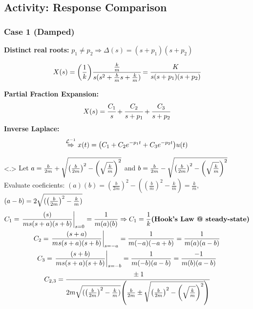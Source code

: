 \documentclass[aspectratio=169]{beamer}
\begin{document}
\subsection{Activity: Response Comparison}
\begin{frame}
	\frametitle{Case 1 (Damped)}

	\textbf{Distinct real roots:}
	$p_1 \neq p_2 \Rightarrow \Delta(s) = (s+p_1) (s+p_2)$

	\pause{}
	\[
		X(s) = \qty(\frac{1}{k}) \cfrac{\frac{k}{m}}{s(s^2 + \frac{b}{m} s + \frac{k}{m})}
		= \cfrac{K}{s(s+p_1)(s+p_2)}
	\]
	\pause{}

	\textbf{Partial Fraction Expansion:} %
	\[
		X(s) = \cfrac{C_1}{s} + \cfrac{C_2}{s+p_1} + \cfrac{C_3}{s+p_2}
	\]
	\pause{}
	\textbf{Inverse Laplace:}
	\[
		\overset{\mathcal{L}^{-1}}{\Rightarrow}
		x(t) = \qty(C_1 + C_2 e^{-p_1t} + C_3 e^{-p_2t}) u(t)	
	\]

	{
		Let $a = \frac{b}{2m} + \sqrt{\qty(\frac{b}{2m})^2 - \qty(\sqrt{\frac{k}{m}})^2}$ and $b = \frac{b}{2m} - \sqrt{\qty(\frac{b}{2m})^2 - \qty(\sqrt{\frac{k}{m}})^2}$
		Evaluate coeficients:
		$(a)(b) = (\frac{b}{2m})^2 - ((\frac{b}{m})^2-\frac{k}{m}) = \frac{k}{m}$, \quad $(a-b) = 2\sqrt{(\qty(\frac{b}{2m})^2 - \frac{k}{m})}$
		\begin{gather*}
			C_1 = \eval{\frac{(s)}{m s(s+a)(s+b)}}_{s=0}
			= \frac{1}{m (a)(b)}
			\Rightarrow
			C_1 = \frac{1}{k} \textbf{(Hook's Law @ steady-state)}
			\\
			C_2 = \eval{\frac{(s+a)}{m s(s+a)(s+b)}}_{s=-a}
			= \frac{1}{m(-a)(-a+b)}
			= \frac{1}{m(a)(a-b)}
			\\
			C_3 = \eval{\frac{(s+b)}{m s(s+a)(s+b)}}_{s=-b}
			= \frac{1}{m(-b)(a-b)}
			= \frac{-1}{m(b)(a-b)}\\
			C_{2,3} = \cfrac{\pm 1}{2m\sqrt{(\qty(\frac{b}{2m})^2 - \frac{k}{m})} \qty(\frac{b}{2m} \pm \sqrt{\qty(\frac{b}{2m})^2 - \qty(\sqrt{\frac{k}{m}})^2})}
		\end{gather*}
	}
	
\end{frame}
\end{document}

